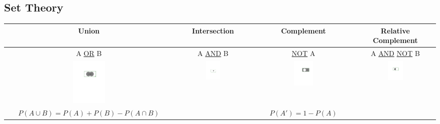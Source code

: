 \documentclass{article}
\begin{document}
\subsection*{Set Theory}
\begin{table}[H]
    \centering
    \begin{adjustbox}{width=\columnwidth,center}
    \begin{tabular}{c| c| c |c}  
        Union & Intersection & Complement & Relative Complement\\ [0.7ex] \hline \vspace{1ex}
       A \underline{OR} B & A \underline{AND} B & \underline{NOT} A & A \underline{AND} \underline{NOT} B \\
       \includegraphics[width=0.2\textwidth]{./images/AorB.pdf}&\includegraphics[width=0.2\textwidth]{./images/AandB.pdf}&\includegraphics[width=0.2\textwidth]{./images/notA.pdf}&\includegraphics[width=0.2\textwidth]{./images/Aand_notB.pdf}\\
       $P(A\cup B) = P(A)+P(B)-P(A\cap B)$ &&$P(A') = 1 - P(A)$ &
    \end{tabular}
    \end{adjustbox}
\end{table}
\end{document}
